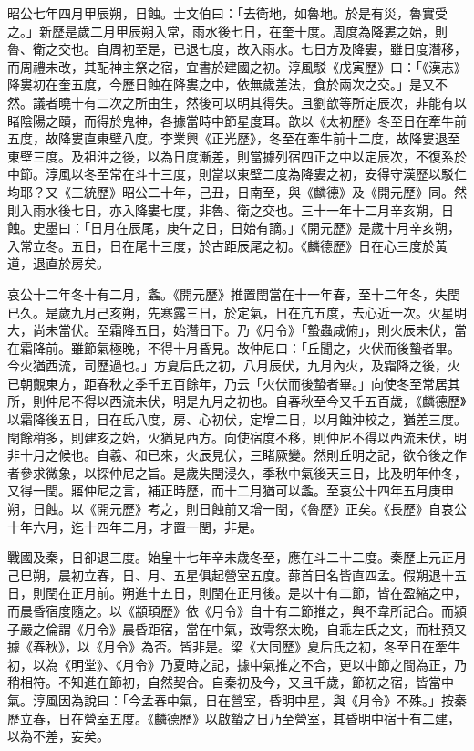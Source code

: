 \begin{pinyinscope}
 昭公七年四月甲辰朔，日蝕。士文伯曰：「去衛地，如魯地。於是有災，魯實受之。」新歷是歲二月甲辰朔入常，雨水後七日，在奎十度。周度為降婁之始，則魯、衛之交也。自周初至是，已退七度，故入雨水。七日方及降婁，雖日度潛移，而周禮未改，其配神主祭之宿，宜書於建國之初。淳風駁《戊寅歷》曰：「《漢志》降婁初在奎五度，今歷日蝕在降婁之中，依無歲差法，食於兩次之交。」是又不然。議者曉十有二次之所由生，然後可以明其得失。且劉歆等所定辰次，非能有以睹陰陽之賾，而得於鬼神，各據當時中節星度耳。歆以《太初歷》冬至日在牽牛前五度，故降婁直東壁八度。李業興《正光歷》，冬至在牽牛前十二度，故降婁退至東壁三度。及祖沖之後，以為日度漸差，則當據列宿四正之中以定辰次，不復系於中節。淳風以冬至常在斗十三度，則當以東壁二度為降婁之初，安得守漢歷以駁仁均耶？又《三統歷》昭公二十年，己丑，日南至，與《麟德》及《開元歷》同。然則入雨水後七日，亦入降婁七度，非魯、衛之交也。三十一年十二月辛亥朔，日蝕。史墨曰：「日月在辰尾，庚午之日，日始有謫。」《開元歷》是歲十月辛亥朔，入常立冬。五日，日在尾十三度，於古距辰尾之初。《麟德歷》日在心三度於黃道，退直於房矣。



 哀公十二年冬十有二月，螽。《開元歷》推置閏當在十一年春，至十二年冬，失閏已久。是歲九月己亥朔，先寒露三日，於定氣，日在亢五度，去心近一次。火星明大，尚未當伏。至霜降五日，始潛日下。乃《月令》「蟄蟲咸俯」，則火辰未伏，當在霜降前。雖節氣極晚，不得十月昏見。故仲尼曰：「丘聞之，火伏而後蟄者畢。今火猶西流，司歷過也。」方夏后氏之初，八月辰伏，九月內火，及霜降之後，火已朝覿東方，距春秋之季千五百餘年，乃云「火伏而後蟄者畢。」向使冬至常居其所，則仲尼不得以西流未伏，明是九月之初也。自春秋至今又千五百歲，《麟德歷》以霜降後五日，日在氐八度，房、心初伏，定增二日，以月蝕沖校之，猶差三度。閏餘稍多，則建亥之始，火猶見西方。向使宿度不移，則仲尼不得以西流未伏，明非十月之候也。自羲、和已來，火辰見伏，三睹厥變。然則丘明之記，欲令後之作者參求微象，以探仲尼之旨。是歲失閏浸久，季秋中氣後天三日，比及明年仲冬，又得一閏。寤仲尼之言，補正時歷，而十二月猶可以螽。至哀公十四年五月庚申朔，日蝕。以《開元歷》考之，則日蝕前又增一閏，《魯歷》正矣。《長歷》自哀公十年六月，迄十四年二月，才置一閏，非是。



 戰國及秦，日卻退三度。始皇十七年辛未歲冬至，應在斗二十二度。秦歷上元正月己巳朔，晨初立春，日、月、五星俱起營室五度。蔀首日名皆直四孟。假朔退十五日，則閏在正月前。朔進十五日，則閏在正月後。是以十有二節，皆在盈縮之中，而晨昏宿度隨之。以《顓頊歷》依《月令》自十有二節推之，與不韋所記合。而潁子嚴之倫謂《月令》晨昏距宿，當在中氣，致雩祭太晚，自乖左氏之文，而杜預又據《春秋》，以《月令》為否。皆非是。梁《大同歷》夏后氏之初，冬至日在牽牛初，以為《明堂》、《月令》乃夏時之記，據中氣推之不合，更以中節之間為正，乃稍相符。不知進在節初，自然契合。自秦初及今，又且千歲，節初之宿，皆當中氣。淳風因為說曰：「今孟春中氣，日在營室，昏明中星，與《月令》不殊。」按秦歷立春，日在營室五度。《麟德歷》以啟蟄之日乃至營室，其昏明中宿十有二建，以為不差，妄矣。




\end{pinyinscope}
